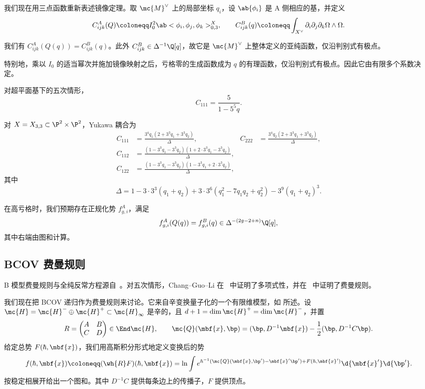 我们现在用三点函数重新表述镜像定理。取 \(\mc{M}^{\vee}\) 上的局部坐标 \(q_i\)，设 \(\ab\{\phi_i\}\) 是 A 侧相应的基，并定义
\[ C^A_{ijk}(Q) \coloneqq I_0^2 \ab<\phi_i, \phi_j, \phi_k>^X_{0,3}, \qquad C^B_{ijk}(q) \coloneqq \int_{X^{\vee}} \partial_i \partial_j \partial_k \Omega \wedge \Omega. \]

\begin{thm}
    我们有 \(C^A_{ijk}(Q(q)) = C^B_{ijk}(q)\)。此外 \(C^B_{ijk} \in \Delta^{-1}\Q[q]\)，故它是 \(\mc{M}^{\vee}\) 上整体定义的亚纯函数，仅沿判别式有极点。
\end{thm}

特别地，乘以 \(I_0\) 的适当幂次并施加镜像映射之后，亏格零的生成函数成为 \(q\) 的有理函数，仅沿判别式有极点。因此它由有限多个系数决定。

\begin{exm}
    对超平面基下的五次情形，
    \[ C_{111} = \frac{5}{1-5^5 q}. \]
\end{exm}

\begin{exm}
    对 \(X = X_{3,3} \subset \P^2 \times \P^2\)，Yukawa 耦合为
    \begin{align*}
        C_{111} &= \frac{3^4 q_1 (2+3^3q_1+3^3q_2)}{\Delta}, & C_{222} &= \frac{3^4 q_2(2+3^3q_1+3^3q_2)}{\Delta}, \\
        C_{112} &= \frac{(1-3^3q_1-3^3q_2)(1+2\cdot 3^3 q_1 - 3^3 q_2)}{\Delta}, \\
        C_{122} &= \frac{(1-3^3q_1-3^3q_2)(1-3^3q_1+2\cdot3^3q_2)}{\Delta},
    \end{align*}
    其中
    \[ \Delta = 1 - 3\cdot3^3(q_1+q_2) + 3\cdot3^6(q_1^2 - 7q_1q_2+q_2^2) - 3^9(q_1+q_2)^3. \]
\end{exm}

在高亏格时，我们预期存在正规化势 \(f^A_{g,i}\)，满足
\[ f^A_{g,i}(Q(q)) = f^B_{g,i}(q) \in \Delta^{-(2g-2+n)}\Q[q], \]
其中右端由图和计算。

\subsection{BCOV 费曼规则}%
\label{sub:The BCOV Feynman rule}

B 模型费曼规则与全纯反常方程源自~\cite{BCOV1994}。对五次情形，Chang--Guo--Li 在~\cite{CGL2021} 中证明了多项式性，并在~\cite{CGL2026} 中证明了费曼规则。

我们现在把 BCOV 递归作为费曼规则来讨论。它来自辛变换量子化的一个有限维模型，如  所述。设 \(\mc{H} = \mc{H}^- \oplus \mc{H}^+ \subset \mc{H}_{\infty}\) 是辛的，且 \(d+1 = \dim \mc{H}^+ = \dim \mc{H}^-\)，并置
\[ R = \begin{pmatrix} A & B \\ C & D \end{pmatrix} \in \End \mc{H}, \qquad \mc{Q}(\mbf{x},\bp) = (\bp, D^{-1}\mbf{x}) - \frac{1}{2}(\bp, D^{-1}C\bp). \]
给定总势 \(F(\hbar, \mbf{x})\)，我们用高斯积分形式地定义变换后的势
\[ f(\hbar, \mbf{x}) \coloneqq (\wh{R}F)(\hbar,\mbf{x}) = \ln \int e^{\hbar^{-1}(\mc{Q}(\mbf{x},\bp') - \mbf{x}'\bp') + F(\hbar,\mbf{x}')}\d{\mbf{x}'}\d{\bp'}. \]
按稳定相展开给出一个图和。其中 \(D^{-1}C\) 提供每条边上的传播子，\(F\) 提供顶点。

